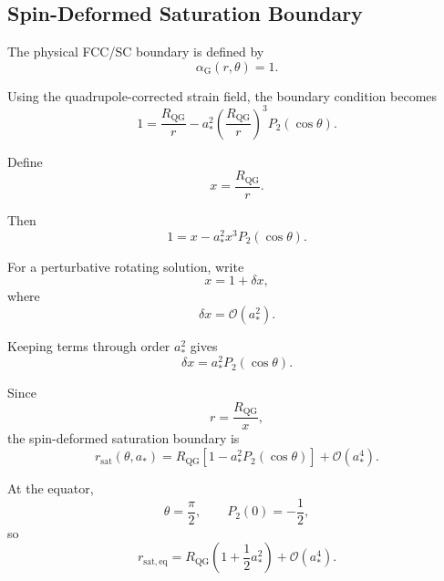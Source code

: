 \subsection{Spin-Deformed Saturation Boundary}

The physical FCC/SC boundary is defined by
\begin{equation}
    \alpha_{\mathrm{G}}(r,\theta) = 1.
\end{equation}

Using the quadrupole-corrected strain field, the boundary condition becomes
\begin{equation}
    1 = \frac{R_{\mathrm{QG}}}{r} - a_\ast^2 \left( \frac{R_{\mathrm{QG}}}{r} \right)^3 P_2(\cos\theta).
\end{equation}

Define
\begin{equation}
    x = \frac{R_{\mathrm{QG}}}{r}.
\end{equation}

Then
\begin{equation}
    1 = x - a_\ast^2x^3P_2(\cos\theta).
\end{equation}

For a perturbative rotating solution, write
\begin{equation}
    x = 1+\delta x,
\end{equation}
where
\begin{equation}
    \delta x = \mathcal{O}(a_\ast^2).
\end{equation}

Keeping terms through order $a_\ast^2$ gives
\begin{equation}
    \delta x = a_\ast^2P_2(\cos\theta).
\end{equation}

Since
\begin{equation}
    r = \frac{R_{\mathrm{QG}}}{x},
\end{equation}
the spin-deformed saturation boundary is
\begin{equation}
    \boxed{ r_{\mathrm{sat}}(\theta,a_\ast) = R_{\mathrm{QG}} \left[ 1 - a_\ast^2P_2(\cos\theta) \right] + \mathcal{O}(a_\ast^4). }
\end{equation}

At the equator,
\begin{equation}
    \theta = \frac{\pi}{2}, \qquad P_2(0) = -\frac{1}{2},
\end{equation}
so
\begin{equation}
    \boxed{ r_{\mathrm{sat,eq}} = R_{\mathrm{QG}} \left( 1+\frac{1}{2}a_\ast^2 \right) + \mathcal{O}(a_\ast^4). }
\end{equation}

